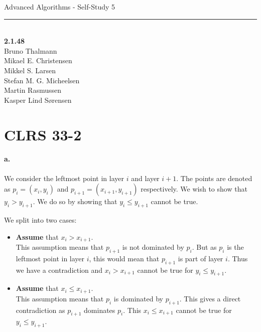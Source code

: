 
\usepackage{mathtools}
\DeclarePairedDelimiter{\ceil}{\lceil}{\rceil}
\DeclarePairedDelimiter\floor{\lfloor}{\rfloor}


\newcommand{\HRule}{\rule{\linewidth}{0.5mm}}


\begin{titlepage}
\centering
{\LARGE Advanced Algorithms - Self-Study 5}
\HRule \\[0.5cm]
\textbf{2.1.48}\\
Bruno Thalmann\\
			Mikael E. Christensen\\
			Mikkel S. Larsen\\
			Stefan M. G. Micheelsen\\
			Martin Rasmussen\\
			Kasper Lind Sørensen	\\
					
\end{titlepage}

\section*{CLRS 33-2}
\paragraph{a.}We consider the leftmost point in layer $i$ and layer $i+1$.
The points are denoted as $p_i = (x_i, y_i)$ and $p_{i +1} = (x_{i +1}, y_{i +1})$ respectively.
We wish to show that $y_i > y_{i +1}$.
We do so by showing that $y_i \leq y_{i +1}$ cannot be true.

We split into two cases:
\begin{itemize}
\item \textbf{Assume} that $x_i > x_{i+1}$.
\\This assumption means that $p_{i+1}$ is not dominated by $p_i$.
But as $p_i$ is the leftmost point in layer $i$, this would mean that $p_{i+1}$ is part of layer $i$.
Thus we have a contradiction and $x_i > x_{i+1}$ cannot be true for $y_i \leq y_{i+1}$.
\item \textbf{Assume} that $x_i \leq x_{i+1}$.
\\This assumption means that $p_i$ is dominated by $p_{i+1}$.
This gives a direct contradiction as $p_{i+1}$ dominates $p_i$.
This $x_i \leq x_{i+1}$ cannot be true for $y_i \leq y_{i+1}$.
\end{itemize}

